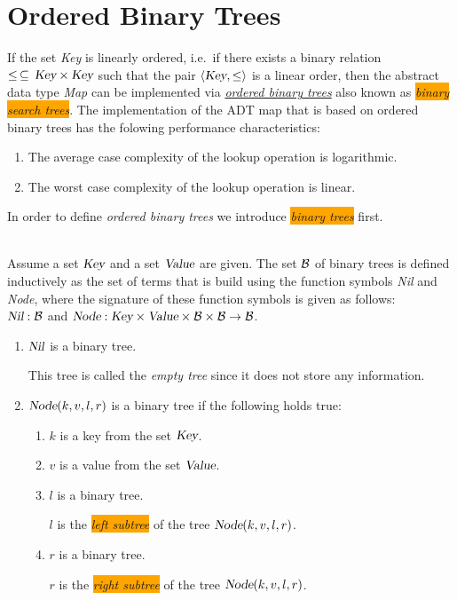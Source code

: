 \section{Ordered Binary Trees}
If the set \textsl{Key} is linearly ordered, i.e.~if there exists a binary relation
$\leq \,\subseteq\,\textsl{Key}\times\textsl{Key}$ such that the pair $\langle \textsl{Key}, \leq \rangle$ is a linear
order, then the abstract data type \textsl{Map} can be implemented via  
\href{https://en.wikipedia.org/wiki/Binary_search_tree}{\emph{ordered binary trees}} also known as
\colorbox{orange}{\emph{binary search trees}}. 
The implementation of the ADT map that is based on ordered binary trees has the folowing performance
characteristics: 
\begin{enumerate}
\item The average case complexity of the lookup operation is logarithmic.
\item The worst case complexity of the lookup operation is linear.  
\end{enumerate}
In order to define \emph{ordered binary trees} we introduce
\colorbox{orange}{\emph{binary trees}} first.

\begin{Definition} \hspace*{\fill} \\
  Assume a set $\textsl{Key}$ and a set $\textsl{Value}$ are given.
  The set $\mathcal{B}$ of binary trees is defined inductively as the set of terms that is build using the
  function symbols \textsl{Nil} and \textsl{Node}, where the signature of these function symbols is
  given as follows: \\[0.1cm]
  \hspace*{1.3cm} 
  $\textsl{Nil}: \mathcal{B}$ \qquad and \qquad  $\textsl{Node}: \textsl{Key} \times \textsl{Value} \times \mathcal{B} \times \mathcal{B} \rightarrow \mathcal{B}$.
  \begin{enumerate}
  \item $\textsl{Nil}$ is a binary tree.

        This tree is called the \emph{empty tree} since it does not store any information.
  \item $\textsl{Node}(k, v, l, r)$ is a binary tree if the following holds true: 
        \begin{enumerate}
        \item $k$ is a key from the set $\textsl{Key}$.
        \item $v$ is a value from the set $\textsl{Value}$.
        \item $l$ is a binary tree.

              $l$ is the  \colorbox{orange}{\emph{left subtree}} of the tree $\textsl{Node}(k, v, l, r)$.
        \item $r$ is a binary tree.

              $r$ is the \colorbox{orange}{\emph{right subtree}} of the tree $\textsl{Node}(k, v, l, r)$.
              \eox
        \end{enumerate}
  \end{enumerate}
\end{Definition}

